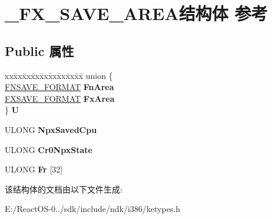 \hypertarget{struct___f_x___s_a_v_e___a_r_e_a}{}\section{\+\_\+\+F\+X\+\_\+\+S\+A\+V\+E\+\_\+\+A\+R\+E\+A结构体 参考}
\label{struct___f_x___s_a_v_e___a_r_e_a}
\subsection*{Public 属性}
\begin{DoxyCompactItemize}
\item 
\mbox{\label{struct___f_x___s_a_v_e___a_r_e_a_ad07144fed7bbafef5c38ade87318f523}} 
\begin{tabbing}
xx\=xx\=xx\=xx\=xx\=xx\=xx\=xx\=xx\=\kill
union \{\\
\>\hyperlink{struct___f_n_s_a_v_e___f_o_r_m_a_t}{FNSAVE\_FORMAT} {\bfseries FnArea}\\
\>\hyperlink{struct___f_x_s_a_v_e___f_o_r_m_a_t}{FXSAVE\_FORMAT} {\bfseries FxArea}\\
\} {\bfseries U}\\

\end{tabbing}\item 
\mbox{\label{struct___f_x___s_a_v_e___a_r_e_a_a4ef3ca16a41d5ceb3a14facc6acdf3de}} 
U\+L\+O\+NG {\bfseries Npx\+Saved\+Cpu}
\item 
\mbox{\label{struct___f_x___s_a_v_e___a_r_e_a_ab28dab30d6108aed88b9651ac7be4837}} 
U\+L\+O\+NG {\bfseries Cr0\+Npx\+State}
\item 
\mbox{\label{struct___f_x___s_a_v_e___a_r_e_a_a19d89eb560c4de4f475ba2a3b507e5d1}} 
U\+L\+O\+NG {\bfseries Fr} \mbox{[}32\mbox{]}
\end{DoxyCompactItemize}


该结构体的文档由以下文件生成\+:\begin{DoxyCompactItemize}
\item 
E\+:/\+React\+O\+S-\/0../sdk/include/ndk/i386/ketypes.\+h\end{DoxyCompactItemize}
